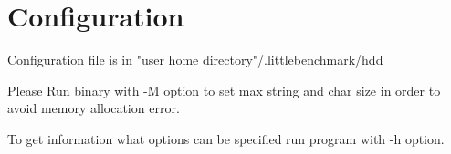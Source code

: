 \hypertarget{Configuration}{
\section{Configuration}
\label{Configuration}
}

Configuration file is in "user home directory"/.littlebenchmark/hdd

Please Run binary with -M option to set max string and char size in order to avoid memory allocation error.

To get information what options can be specified run program with -h option.
